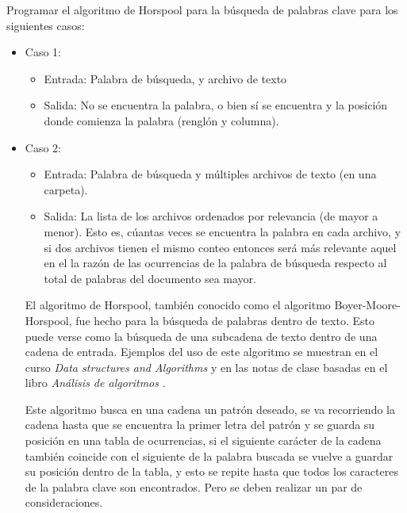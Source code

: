 Programar el algoritmo de Horspool para la búsqueda de palabras clave para los siguientes casos:
\begin{itemize}
    \item Caso 1:
    \begin{itemize}
        \item Entrada: Palabra de búsqueda, y archivo de texto  
        \item Salida: No se encuentra la palabra, o bien sí se encuentra y la posición donde comienza la palabra (renglón y columna).
    \end{itemize}
    \item Caso 2:
    \begin{itemize}
        \item Entrada: Palabra de búsqueda y múltiples archivos de texto  (en una carpeta).
        \item Salida: La lista de los archivos ordenados por relevancia (de mayor a menor). Esto es, cúantas veces se encuentra la palabra en cada archivo, y si dos archivos tienen el mismo conteo entonces será más relevante aquel en el la razón de las ocurrencias de la palabra de búsqueda respecto al total de palabras del documento sea mayor.
    \end{itemize}
    \begin{solution}
        El algoritmo de Horspool, también conocido como el algoritmo Boyer-Moore-Horspool, fue hecho para la búsqueda de palabras dentro de texto. Esto puede verse como la búsqueda de una subcadena de texto dentro de una cadena de entrada. Ejemplos del uso de este algoritmo se muestran en el curso \textit{Data structures and Algorithms} \cite{shun2013horspool} y en las notas de clase basadas en el libro \textit{Análisis de algoritmos} \cite{homero2013algoritmos}.

        Este algoritmo busca en una cadena un patrón deseado, se va recorriendo la cadena hasta que se encuentra la primer letra del patrón y se guarda su posición en una tabla de ocurrencias, si el siguiente carácter de la cadena también coincide con el siguiente de la palabra buscada se vuelve a guardar su posición dentro de la tabla, y esto se repite hasta que todos los caracteres de la palabra clave son encontrados. Pero se deben realizar un par de consideraciones.


\end{solution}
\end{itemize}
